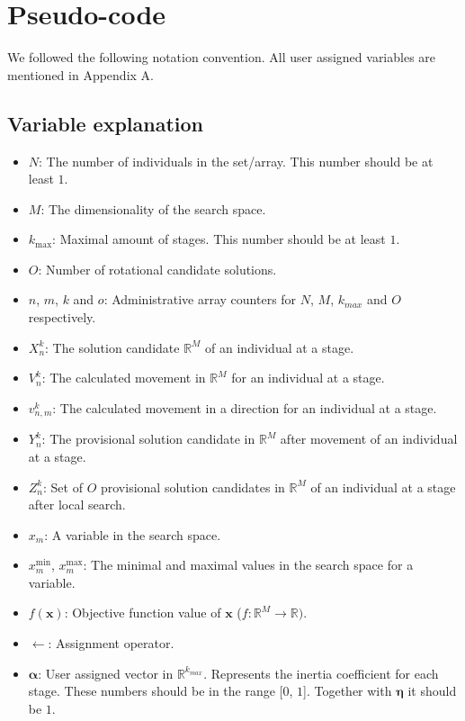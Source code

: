 \documentclass[runningheads]{llncs}
\begin{document}
\section{Pseudo-code}
\label{secPseu}
We followed the following notation convention. All user assigned variables are mentioned in Appendix A.
\subsection{Variable explanation}
\begin{itemize}
    \item $N$: The number of individuals in the set/array. This number should be at least $1$.
    \item $M$: The dimensionality of the search space.
    \item $k_{\text{max}}$: Maximal amount of stages. This number should be at least $1$.
    \item $O$: Number of rotational candidate solutions.
    \item $n$, $m$, $k$ and $o$: Administrative array counters for $N$, $M$, $k_{max}$ and $O$ respectively.
    \item $X_n^k$: The solution candidate $\mathds{R}^M$ of an individual at a stage.
    \item $V_n^k$: The calculated movement in $\mathds{R}^M$ for an individual at a stage.
    \item $v_{n,m}^k$: The calculated movement in a direction for an individual at a stage.
    \item $Y_n^k$: The provisional solution candidate in $\mathds{R}^M$ after movement of an individual at a stage.
    \item $Z_n^{k}$: Set of $O$ provisional solution candidates in $\mathds{R}^M$ of an individual at a stage after local search.
    \item $x_m$: A variable in the search space.
    \item $x_m^{\text{min}}$, $x_m^{\text{max}}$: The minimal and maximal values in the search space for a variable.
    \item $f(\mathbf{x})$: Objective function value of $\mathbf{x}$ ($f: \mathds{R}^M \rightarrow \mathds{R})$.
    \item $\leftarrow$: Assignment operator.
    \item $\boldsymbol{\alpha}$: User assigned vector in $\mathds{R}^{k_{max}}$. Represents the inertia coefficient for each stage. These numbers should be in the range [$0$, $1$]. Together with $\boldsymbol{\eta}$ it should be $1$.

\end{itemize}
\end{document}
